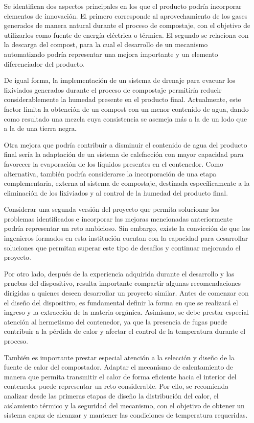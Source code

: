 Se identifican dos aspectos principales en los que el producto podría incorporar elementos de innovación. El primero corresponde al aprovechamiento de los gases generados de manera natural durante el proceso de compostaje, con el objetivo de utilizarlos como fuente de energía eléctrica o térmica. El segundo se relaciona con la descarga del compost, para la cual el desarrollo de un mecanismo automatizado podría representar una mejora importante y un elemento diferenciador del producto.

De igual forma, la implementación de un sistema de drenaje para evacuar los lixiviados generados durante el proceso de compostaje permitiría reducir considerablemente la humedad presente en el producto final. Actualmente, este factor limita la obtención de un compost con un menor contenido de agua, dando como resultado una mezcla cuya consistencia se asemeja más a la de un lodo que a la de una tierra negra.

Otra mejora que podría contribuir a disminuir el contenido de agua del producto final sería la adaptación de un sistema de calefacción con mayor capacidad para favorecer la evaporación de los líquidos presentes en el contenedor. Como alternativa, también podría considerarse la incorporación de una etapa complementaria, externa al sistema de compostaje, destinada específicamente a la eliminación de los lixiviados y al control de la humedad del producto final.

Considerar una segunda versión del proyecto que permita solucionar los problemas identificados e incorporar las mejoras mencionadas anteriormente podría representar un reto ambicioso. Sin embargo, existe la convicción de que los ingenieros formados en esta institución cuentan con la capacidad para desarrollar soluciones que permitan superar este tipo de desafíos y continuar mejorando el proyecto.

Por otro lado, después de la experiencia adquirida durante el desarrollo y las pruebas del dispositivo, resulta importante compartir algunas recomendaciones dirigidas a quienes deseen desarrollar un proyecto similar. Antes de comenzar con el diseño del dispositivo, es fundamental definir la forma en que se realizará el ingreso y la extracción de la materia orgánica. Asimismo, se debe prestar especial atención al hermetismo del contenedor, ya que la presencia de fugas puede contribuir a la pérdida de calor y afectar el control de la temperatura durante el proceso.

También es importante prestar especial atención a la selección y diseño de la fuente de calor del compostador. Adaptar el mecanismo de calentamiento de manera que permita transmitir el calor de forma eficiente hacia el interior del contenedor puede representar un reto considerable. Por ello, se recomienda analizar desde las primeras etapas de diseño la distribución del calor, el aislamiento térmico y la seguridad del mecanismo, con el objetivo de obtener un sistema capaz de alcanzar y mantener las condiciones de temperatura requeridas.
\newpage
